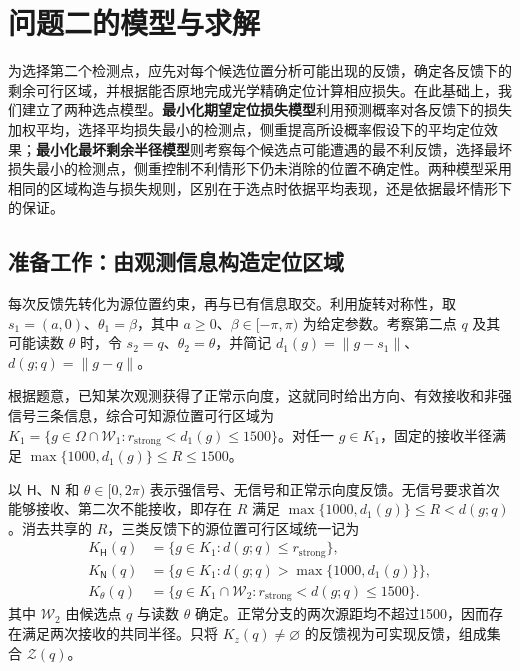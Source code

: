 \section{问题二的模型与求解}

为选择第二个检测点，应先对每个候选位置分析可能出现的反馈，确定各反馈下的剩余可行区域，并根据能否原地完成光学精确定位计算相应损失。在此基础上，我们建立了两种选点模型。\textbf{最小化期望定位损失模型}利用预测概率对各反馈下的损失加权平均，选择平均损失最小的检测点，侧重提高所设概率假设下的平均定位效果；\textbf{最小化最坏剩余半径模型}则考察每个候选点可能遭遇的最不利反馈，选择最坏损失最小的检测点，侧重控制不利情形下仍未消除的位置不确定性。两种模型采用相同的区域构造与损失规则，区别在于选点时依据平均表现，还是依据最坏情形下的保证。

\subsection{准备工作：由观测信息构造定位区域}

每次反馈先转化为源位置约束，再与已有信息取交。利用旋转对称性，取 \(s_1=(a,0)\)、\(\theta_1=\beta\)，其中 \(a\ge0\)、\(\beta\in[-\pi,\pi)\) 为给定参数。考察第二点 \(q\) 及其可能读数 \(\theta\) 时，令 \(s_2=q\)、\(\theta_2=\theta\)，并简记 \(d_1(g)=\|g-s_1\|\)、\(d(g;q)=\|g-q\|\)。

根据题意，已知某次观测获得了正常示向度，这就同时给出方向、有效接收和非强信号三条信息，综合可知源位置可行区域为 \(K_1=\{g\in\Omega\cap\mathcal W_1:r_{\mathrm{strong}}<d_1(g)\le1500\}\)。对任一 \(g\in K_1\)，固定的接收半径满足 \(\max\{1000,d_1(g)\}\le R\le1500\)。

以 \(\mathsf H\)、\(\mathsf N\) 和 \(\theta\in[0,2\pi)\) 表示强信号、无信号和正常示向度反馈。无信号要求首次能够接收、第二次不能接收，即存在 \(R\) 满足 \(\max\{1000,d_1(g)\}\le R<d(g;q)\)。消去共享的 \(R\)，三类反馈下的源位置可行区域统一记为
\begin{equation}
\begin{aligned}
K_{\mathsf H}(q)&=\{g\in K_1:d(g;q)\le r_{\mathrm{strong}}\},\\
K_{\mathsf N}(q)&=\{g\in K_1:d(g;q)>\max\{1000,d_1(g)\}\},\\
K_\theta(q)&=\{g\in K_1\cap\mathcal W_2:r_{\mathrm{strong}}<d(g;q)\le1500\}.
\end{aligned}
\label{eq:q2-pair-regions}
\end{equation}
其中 \(\mathcal W_2\) 由候选点 \(q\) 与读数 \(\theta\) 确定。正常分支的两次源距均不超过1500，因而存在满足两次接收的共同半径。只将 \(K_z(q)\ne\varnothing\) 的反馈视为可实现反馈，组成集合 \(\mathcal Z(q)\)。

